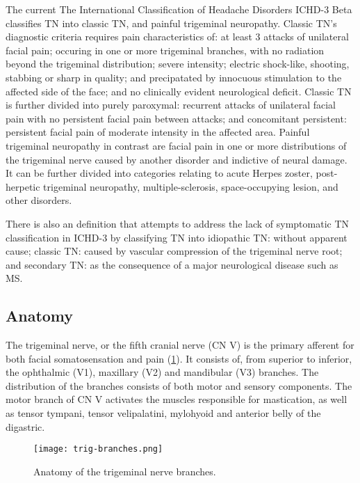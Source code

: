 The current The International Classification of Headache Disorders ICHD-3 Beta \cite{Society2013} classifies TN into classic TN, and painful trigeminal neuropathy. 
Classic TN's diagnostic criteria requires pain characteristics of: at least 3 attacks of unilateral facial pain; occuring in one or more trigeminal branches, with no radiation beyond the trigeminal distribution; severe intensity; electric shock-like, shooting, stabbing or sharp in quality; and precipatated by innocuous stimulation to the affected side of the face; and no clinically evident neurological deficit. Classic TN is further divided into purely paroxymal: recurrent attacks of unilateral facial pain with no persistent facial pain between attacks; and concomitant persistent: persistent facial pain of moderate intensity in the affected area. 
Painful trigeminal neuropathy in contrast are facial pain in one or more distributions of the trigeminal nerve caused by another disorder and indictive of neural damage. It can be further divided into categories relating to acute Herpes zoster, post-herpetic trigeminal neuropathy, multiple-sclerosis, space-occupying lesion, and other disorders.

There is also an definition \cite{Zakrzewska2016} that attempts to address the lack of symptomatic TN classification in ICHD-3 by classifying TN into idiopathic TN: without apparent cause; classic TN: caused by vascular compression of the trigeminal nerve root; and secondary TN: as the consequence of a major neurological disease such as MS. 

\subsection{Anatomy}

The trigeminal nerve, or the fifth cranial nerve (CN V) is the primary afferent for both facial somatosensation and pain (\ref{fig:trig-branches}). It consists of, from superior to inferior, the ophthalmic (V1), maxillary (V2) and mandibular (V3) branches. The distribution of the branches consists of both motor and sensory components. The motor branch of CN V activates the muscles responsible for mastication, as well as tensor tympani, tensor velipalatini, mylohyoid and anterior belly of the digastric. 

 \begin{figure}[ht]
 \texttt{[image: trig-branches.png]}
 \centering
 \caption{Anatomy of the trigeminal nerve branches.} 
 \label{fig:trig-branches} 
 \end{figure}
 

